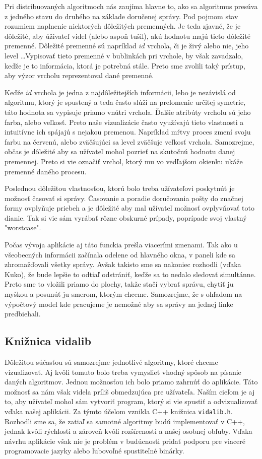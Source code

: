 Pri distribuovaných algoritmoch nás zaujíma hlavne to, ako sa algoritmus presúva z jedného stavu do
druhého na základe doručenej správy. Pod pojmom stav rozumiem naplnenie niektorých dôležitých
premenných. Je teda zjavné, že je dôležité, aby úživateľ videl (alebo aspoň tušil), akú hodnotu majú
tieto dôležité premenné. Dôležité premenné sú napríklad $id$ vrchola, či je živý alebo nie, jeho
level \dots Vypisovať tieto premenné v bublinkách pri vrchole, by však zavadzalo, keďže je to
informácia, ktorá je potrebná stále. Preto sme zvolili taký prístup, aby výzor vrcholu reprezentoval
dané premenné.

Keďže $id$ vrchola je jedna z najdôležitejších informácii, lebo je nezávislá od algoritmu, ktorý je
spustený a teda často slúži na prelomenie určitej symetrie, táto hodnota sa vypisuje priamo vnútri
vrchola. Ďalšie atribúty vrcholu sú jeho farba, alebo veľkosť. Preto naše vizualizácie často
využívajú tieto vlastnosti a intuitívne ich spájajú s nejakou premenou. Napríklad mŕtvy proces zmení
svoju farbu na červenú, alebo zväčšujúci sa level zväčšuje veľkosť vrchola.
Samozrejme, občas je dôležité aby sa užívateľ mohol pozrieť na skutočnú hodnotu danej premennej.
Preto si vie označiť vrchol, ktorý mu vo vedľajšom okienku ukáže premenné daného procesu.

Poslednou dôležitou vlastnosťou, ktorú bolo treba užívateľovi poskytnúť je možnosť časovať si
správy. Časovanie a poradie doručovania pošty do značnej formy ovplyňuje priebeh a je dôležité aby
mal užívateľ možnosť ovplyvňovať toto dianie. Tak si vie sám vyrábať rôzne obskurné prípady,
poprípade svoj vlastný "worstcase".

Počas vývoja aplikácie aj táto funckia prešla viacerími zmenami. Tak ako u všeobecných informácii
začínala odelene od hlavného okna, v paneli kde sa zhromažďovali všetky správy. Avšak takisto sme sa
nakoniec rozhodli (vďaka Kuko), že bude lepšie to odtiaľ odstrániť, keďže sa to nedalo sledovať
simultánne. Preto sme to vložili priamo do plochy, takže stačí vybrať správu, chytiť ju myškou a
posunúť ju smerom, ktorým chceme. Samozrejme, že s ohľadom na výpočtový model kde pracujeme je
nemožné aby sa správy na jednej linke predbiehali.

\subsection{Knižnica vidalib}

Dôležitou súčasťou sú samozrejme jednotlivé algoritmy, ktoré chceme vizualizovať. Aj kvôli tomuto bolo
treba vymyslieť vhodný spôsob na písanie daných algoritmov. Jednou možnosťou ich bolo priamo zahrnúť
do aplikácie. Táto možnosť sa nám však videla príliš obmedzujúca pre užívateľa. Naším cieľom je aj
to, aby užívateľ mohol sám vytvoriť program, ktorý si vie spustiť a odvizualizovať vďaka našej
aplikácii. Za týmto účelom vznikla C++ knižnica \verb!vidalib.h!. Rozhodli sme sa, že zatiaľ sa samotné
algoritmy budú implementovať v C++, jednak kvôli rýchlosti a zároveň kvôli rozšírenosti a našej
osobnej obľuby. Vďaka návrhu aplikácie však nie je problém v budúcnosti pridať podporu pre viaceré
programovacie jazyky alebo ľubovoľné spustiteľné binárky.

